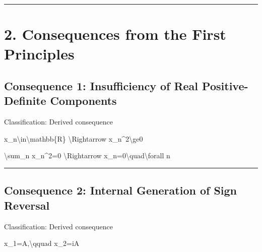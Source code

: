 \documentclass[
  a4paper]{article}
\newenvironment{Shaded}{}{}
\newcommand{\NormalTok}[1]{#1}
\begin{document}
\begin{center}\rule{0.5\linewidth}{0.5pt}\end{center}

\section{2. Consequences from the First
Principles}\label{consequences-from-the-first-principles}

\subsection{Consequence 1: Insufficiency of Real Positive-Definite
Components}\label{consequence-1-insufficiency-of-real-positive-definite-components}

Classification: Derived consequence

\begin{Shaded}
\begin{Highlighting}[]
\NormalTok{x\_n\textbackslash{}in\textbackslash{}mathbb\{R\}}
\NormalTok{\textbackslash{}Rightarrow}
\NormalTok{x\_n\^{}2\textbackslash{}ge0}
\end{Highlighting}
\end{Shaded}

\begin{Shaded}
\begin{Highlighting}[]
\NormalTok{\textbackslash{}sum\_n x\_n\^{}2=0}
\NormalTok{\textbackslash{}Rightarrow}
\NormalTok{x\_n=0\textbackslash{}quad\textbackslash{}forall n}
\end{Highlighting}
\end{Shaded}

\begin{center}\rule{0.5\linewidth}{0.5pt}\end{center}

\subsection{Consequence 2: Internal Generation of Sign
Reversal}\label{consequence-2-internal-generation-of-sign-reversal}

Classification: Derived consequence

\begin{Shaded}
\begin{Highlighting}[]
\NormalTok{x\_1=A,\textbackslash{}qquad x\_2=iA}
\end{Highlighting}
\end{Shaded}
\end{document}
